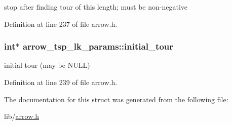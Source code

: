 stop after finding tour of this length; must be non-negative 

Definition at line 237 of file arrow.h.\hypertarget{structarrow__tsp__lk__params_1684519ac0bb6e529707b59f6cd7d528}{
\subsubsection{\setlength{\rightskip}{0pt plus 5cm}int$\ast$ {\bf arrow\_\-tsp\_\-lk\_\-params::initial\_\-tour}}}
\label{structarrow__tsp__lk__params_1684519ac0bb6e529707b59f6cd7d528}


initial tour (may be NULL) 

Definition at line 239 of file arrow.h.

The documentation for this struct was generated from the following file:\begin{CompactItemize}
\item 
lib/\hyperlink{arrow_8h}{arrow.h}\end{CompactItemize}
